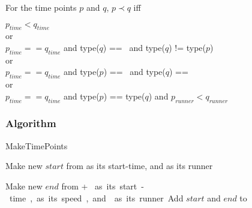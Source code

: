 For the time points $p$ and $q$, $p \prec q$ iff \\

\begin{center}
$p_{time} < q_{time}$\\
or \\
$p_{time} == q_{time}$ and type($q$) == \comFin\, and type($q$) != type($p$)\\
or \\
$p_{time} == q_{time}$ and type($p$) == \comStart\, and type($q$) == \comEnd \\
or \\
$p_{time} == q_{time}$ and type($p$) == type($q$) and $p_{runner} < q_{runner}$
\end{center}

\subsubsection{Algorithm}
\begin{algorithm}[H]
\caption{MakeTimePoints}
\highlights
{}
 
Make new \startT $start$ from \start as its start-time, and \run as its runner
  
Make new \eT $end$ from \start + \unit * \n as its start-time, \unit as its speed, and \run as its runner
    
Add $start$ and $end$ to \li

\return \li
\end{algorithm}

